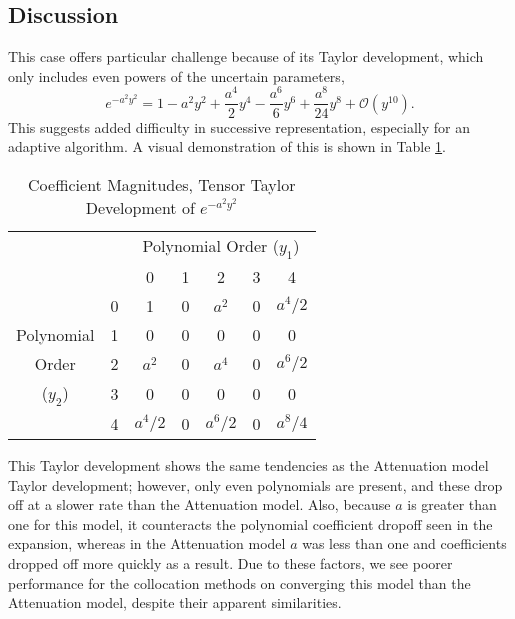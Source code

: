 \subsection{Discussion}
This case offers particular challenge because of its Taylor development, which only includes even powers of
the uncertain parameters,
\begin{equation}\label{eq: taylor peak}
  e^{-a^2y^2} = 1 - a^2y^2 + \frac{a^4}{2}y^4 - \frac{a^6}{6}y^6 + \frac{a^8}{24}y^8 + \mathcal{O}(y^10).
\end{equation}
This suggests added difficulty in successive representation, especially for an
adaptive algorithm.  A visual demonstration of this is shown in Table
\ref{tab: gauss coeffs}.
\begin{table}
  \centering
  \begin{tabular}{|c c|c c c c c|}
    \cline{3-7}\multicolumn{2}{c|}{ } & \multicolumn{5}{c|}{Polynomial Order ($y_1$)} \\
\multicolumn{2}{c|}{ } & 0       & 1 & 2       & 3 & 4       \\
    \hline         & 0 & 1       & 0 & $a^2$   & 0 & $a^4/2$ \\ 
Polynomial         & 1 & 0       & 0 & 0       & 0 & 0       \\
Order              & 2 & $a^2$   & 0 & $a^4$   & 0 & $a^6/2$ \\
($y_2$)            & 3 & 0       & 0 & 0       & 0 & 0       \\
                   & 4 & $a^4/2$ & 0 & $a^6/2$ & 0 & $a^8/4$ \\
    \hline
  \end{tabular}
  \caption{Coefficient Magnitudes, Tensor Taylor Development of $e^{-a^2y^2}$}
  \label{tab: gauss coeffs}
\end{table}
This Taylor development shows the same tendencies as the Attenuation model Taylor development; however, only
even polynomials are present, and these drop off at a slower rate than the Attenuation model.  Also, because
$a$ is greater than one for this model, it counteracts the polynomial coefficient dropoff seen in the
expansion, whereas in the Attenuation model $a$ was less than one and coefficients dropped off more quickly as
a result.  Due to these factors, we see poorer performance for the collocation methods on converging this
model than the Attenuation model, despite their apparent similarities.

